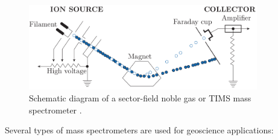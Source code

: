 \documentclass{book}
\newif\ifpdf
\begin{document}
\begin{figure}[!ht]
  \centering
  \ifpdf
  \def\svgwidth{\textwidth}
  
  \else
  \includegraphics[width=10cm]{mass-spec.png}
  \fi
  \caption{Schematic diagram of a sector-field noble gas or TIMS mass
    spectrometer \citep[modified from][]{allegre2008}.}
  \label{fig:mass-spec}
\end{figure}

Several types of mass spectrometers are used for geoscience
applications:
\end{document}
